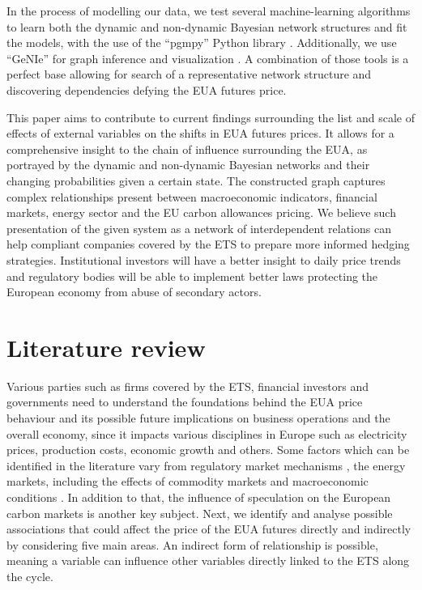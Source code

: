\documentclass[12pt, letterpaper]{article}
\begin{document}
In the process of modelling our data, we test several machine-learning algorithms to learn both the dynamic and non-dynamic Bayesian network structures and fit the models, with the use of the “pgmpy” Python library \parencite{ankan2024}. Additionally, we use “GeNIe” for graph inference and visualization \parencite{bayesfusion}. A combination of those tools is a perfect base allowing for search of a representative network structure and discovering dependencies defying the EUA futures price.

This paper aims to contribute to current findings surrounding the list and scale of effects of external variables on the shifts in EUA futures prices. It allows for a comprehensive insight to the chain of influence surrounding the EUA, as portrayed by the dynamic and non-dynamic Bayesian networks and their changing probabilities given a certain state. The constructed graph captures complex relationships present between macroeconomic indicators, financial markets, energy sector and the EU carbon allowances pricing. We believe such presentation of the given system as a network of interdependent relations can help compliant companies covered by the ETS to prepare more informed hedging strategies. Institutional investors will have a better insight to daily price trends and regulatory bodies will be able to implement better laws protecting the European economy from abuse of secondary actors.

\pagestyle{fancy} 

\section{Literature review}

Various parties such as firms covered by the ETS, financial investors and governments need to understand the foundations behind the EUA price behaviour and its possible future implications on business operations and the overall economy, since it impacts various disciplines in Europe such as electricity prices, production costs, economic growth and others. Some factors which can be identified in the literature vary from regulatory market mechanisms \parencite{borghesi2023, tan2017}, the energy markets, including the effects of commodity markets and macroeconomic conditions \parencite{salvagnin2024, tan2017, wang2020}. In addition to that, the influence of speculation on the European carbon markets is another key subject. Next, we identify and analyse possible associations that could affect the price of the EUA futures directly and indirectly by considering five main areas. An indirect form of relationship is possible, meaning a variable can influence other variables directly linked to the ETS along the cycle. 
\end{document}
